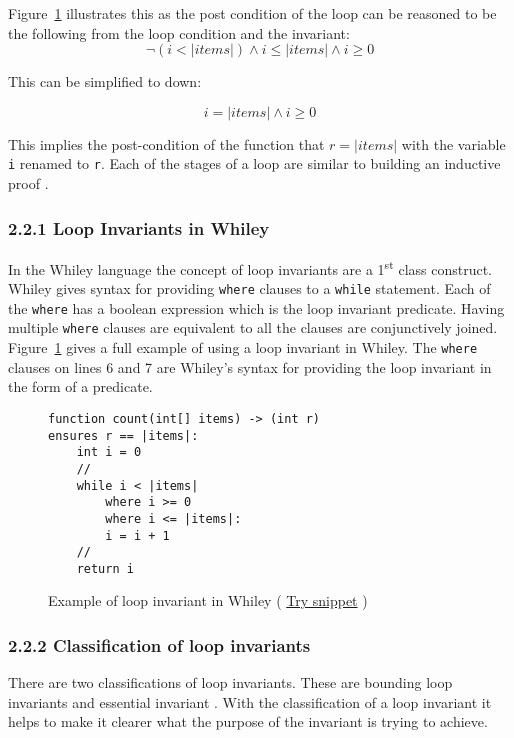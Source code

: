 \documentclass[11pt, a4paper, twoside, openright]{report}
\newcommand{\code}[1]{\texttt{#1}}
\begin{document}
Figure~\ref{lst:whiley-inv} illustrates this as the
post condition of the loop can be reasoned to be the following
from the loop condition and the invariant:
$$\neg{ ( i < |items| ) } \wedge i \leq |items| \wedge i \geq 0$$

This can be simplified to down:

$$ i = |items| \wedge i \geq 0$$

This implies the post-condition of the function that $r = |items|$ with
the variable \code{i} renamed to \code{r}.
Each of the stages of a loop are similar to building an inductive proof \cite{invarints-classifiction}.

\subsubsection*{2.2.1 Loop Invariants in Whiley}

In the Whiley language the concept of loop invariants are a 1\textsuperscript{st} class
construct.
Whiley gives syntax for providing \code{where} clauses to a \code{while}
statement.
Each of the \code{where} has a boolean expression which is the loop
invariant predicate.
Having multiple \code{where} clauses are equivalent to all the clauses are
conjunctively joined.
Figure~\ref{lst:whiley-inv} gives a full example of using a loop invariant
in Whiley. The \code{where} clauses on lines 6 and 7 are Whiley's syntax for
providing the loop invariant in the form of a predicate.

\begin{figure}[ht]
\begin{lstlisting}
function count(int[] items) -> (int r)
ensures r == |items|:
    int i = 0
    //
    while i < |items|
        where i >= 0
        where i <= |items|:
        i = i + 1
    //
    return i
\end{lstlisting}
    \caption{Example of loop invariant in Whiley (
    \href{http://whiley.org/play/?id=DzLm1T}{Try snippet} ) }
    \label{lst:whiley-inv}
\end{figure}

\subsubsection*{2.2.2 Classification of loop invariants}

There are two classifications of loop invariants.
These are bounding loop invariants and essential invariant
\cite{invarints-classifiction}.
With the classification of a loop invariant it helps to make
it clearer what the purpose of the invariant is trying to achieve.
\end{document}
